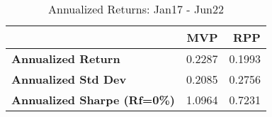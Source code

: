 \begin{table}
      \centering
      \begingroup
      \fontsize{9}{9}
      \selectfont 
\begin{tabular}{>{}lrr}
\toprule
  & MVP & RPP\\
\midrule
\textbf{Annualized Return} & 0.2287 & 0.1993\\
\textbf{Annualized Std Dev} & 0.2085 & 0.2756\\
\textbf{Annualized Sharpe (Rf=0\%)} & 1.0964 & 0.7231\\
\bottomrule
\end{tabular} \caption{Annualized Returns: Jan17 - Jun22}
      \label{tab: Low10 }  
      \endgroup{}
      \end{table}